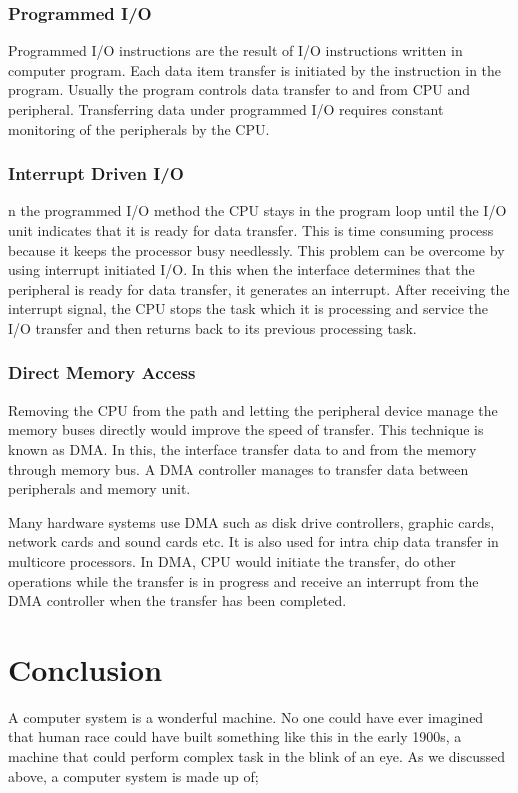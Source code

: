 \documentclass{article}
\begin{document}
\subsubsection{Programmed I/O}
Programmed I/O instructions are the result of I/O instructions written in computer program. Each data item transfer is initiated by the instruction in the program. Usually the program controls data transfer to and from CPU and peripheral. Transferring data under programmed I/O requires constant monitoring of the peripherals by the CPU.

\subsubsection{Interrupt Driven I/O}
n the programmed I/O method the CPU stays in the program loop until the I/O unit indicates that it is ready for data transfer. This is time consuming process because it keeps the processor busy needlessly. This problem can be overcome by using interrupt initiated I/O. In this when the interface determines that the peripheral is ready for data transfer, it generates an interrupt. After receiving the interrupt signal, the CPU stops the task which it is processing and service the I/O transfer and then returns back to its previous processing task.

\subsubsection{Direct Memory Access}
Removing the CPU from the path and letting the peripheral device manage the memory buses directly would improve the speed of transfer. This technique is known as DMA. In this, the interface transfer data to and from the memory through memory bus. A DMA controller manages to transfer data between peripherals and memory unit.

\par Many hardware systems use DMA such as disk drive controllers, graphic cards, network cards and sound cards etc. It is also used for intra chip data transfer in multicore processors. In DMA, CPU would initiate the transfer, do other operations while the transfer is in progress and receive an interrupt from the DMA controller when the transfer has been completed.

\newpage
\section{Conclusion}
A computer system is a wonderful machine. No one could have ever imagined that human race could have built something like this in the early 1900s, a machine that could perform complex task in the blink of an eye. As we discussed above, a computer system is made up of;
\end{document}
